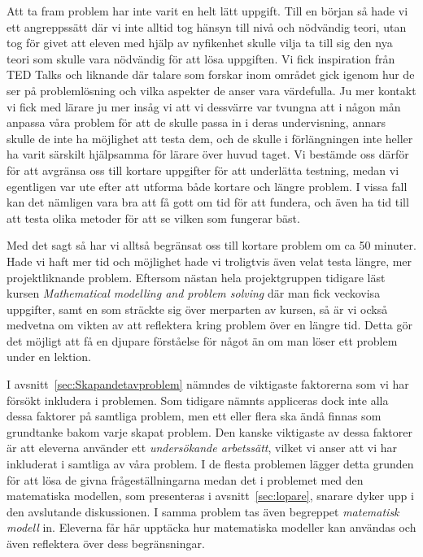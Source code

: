 \noindent \textcolor{Mahogany}{Att ta fram problem har inte varit en helt lätt uppgift. Till en början så hade vi ett angreppssätt där vi inte alltid tog hänsyn till nivå och nödvändig teori, utan tog för givet att eleven med hjälp av nyfikenhet skulle vilja ta till sig den nya teori som skulle vara nödvändig för att lösa uppgiften. Vi fick inspiration från TED Talks och liknande där talare som forskar inom området gick igenom hur de ser på problemlösning och vilka aspekter de anser vara värdefulla. Ju mer kontakt vi fick med lärare ju mer insåg vi att vi dessvärre var tvungna att i någon mån anpassa våra problem för att de skulle passa in i deras undervisning, annars skulle de inte ha möjlighet att testa dem, och de skulle i förlängningen inte heller ha varit särskilt hjälpsamma för lärare över huvud taget. Vi bestämde oss därför för att avgränsa oss till kortare uppgifter för att underlätta testning, medan vi egentligen var ute efter att utforma både kortare och längre problem. I vissa fall kan det nämligen vara bra att få gott om tid för att fundera, och även ha tid till att testa olika metoder för att se vilken som fungerar bäst.}

\textcolor{Mahogany}{Med det sagt så har vi alltså begränsat oss till kortare problem om ca 50 minuter. Hade vi haft mer tid och möjlighet hade vi troligtvis även velat testa längre, mer projektliknande problem. Eftersom nästan hela projektgruppen tidigare läst kursen \textsl{Mathematical modelling and problem solving}\cite{matmod} där man fick veckovisa uppgifter, samt en som sträckte sig över merparten av kursen, så är vi också medvetna om vikten av att reflektera kring problem över en längre tid. Detta gör det möjligt att få en djupare förståelse för något än om man löser ett problem under en lektion.}

\textcolor{lila}{I avsnitt~\ref{sec:Skapandetavproblem} nämndes de viktigaste faktorerna som vi har försökt inkludera i problemen. Som tidigare nämnts appliceras dock inte alla dessa faktorer på samtliga problem, men ett eller flera ska ändå finnas som grundtanke bakom varje skapat problem. Den kanske viktigaste av dessa faktorer är att eleverna använder ett \textsl{undersökande arbetssätt}, vilket vi anser att vi har inkluderat i samtliga av våra problem. I de flesta problemen lägger detta grunden för att lösa de givna frågeställningarna medan det i problemet med den matematiska modellen, som presenteras i avsnitt~\ref{sec:lopare}, snarare dyker upp i den avslutande diskussionen. I samma problem tas även begreppet \textsl{matematisk modell} in. Eleverna får här upptäcka hur matematiska modeller kan användas och även reflektera över dess begränsningar.} 

